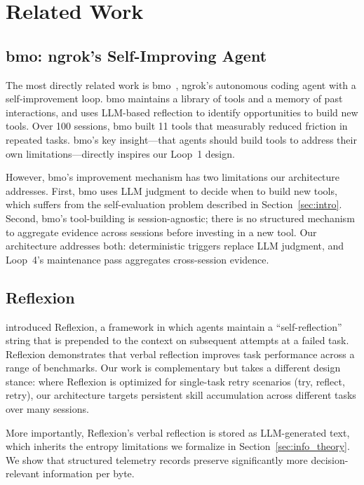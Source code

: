 \section{Related Work}

\label{sec:related}

\subsection{bmo: ngrok's Self-Improving Agent}

The most directly related work is bmo~\cite{bmo2024}, ngrok's autonomous coding
agent with a self-improvement loop. bmo maintains a library of tools and a
memory of past interactions, and uses LLM-based reflection to identify
opportunities to build new tools. Over 100 sessions, bmo built 11 tools that
measurably reduced friction in repeated tasks. bmo's key insight---that agents
should build tools to address their own limitations---directly inspires our
Loop~1 design.

However, bmo's improvement mechanism has two limitations our architecture
addresses. First, bmo uses LLM judgment to decide when to build new tools,
which suffers from the self-evaluation problem described in Section~\ref{sec:intro}.
Second, bmo's tool-building is session-agnostic; there is no structured
mechanism to aggregate evidence across sessions before investing in a new tool.
Our architecture addresses both: deterministic triggers replace LLM judgment,
and Loop~4's maintenance pass aggregates cross-session evidence.

\subsection{Reflexion}

\cite{shinn2023reflexion} introduced Reflexion, a framework in which agents
maintain a ``self-reflection'' string that is prepended to the context on
subsequent attempts at a failed task. Reflexion demonstrates that verbal
reflection improves task performance across a range of benchmarks. Our work
is complementary but takes a different design stance: where Reflexion is
optimized for single-task retry scenarios (try, reflect, retry), our
architecture targets persistent skill accumulation across different tasks over
many sessions.

More importantly, Reflexion's verbal reflection is stored as LLM-generated text,
which inherits the entropy limitations we formalize in
Section~\ref{sec:info_theory}. We show that structured telemetry records
preserve significantly more decision-relevant information per byte.

